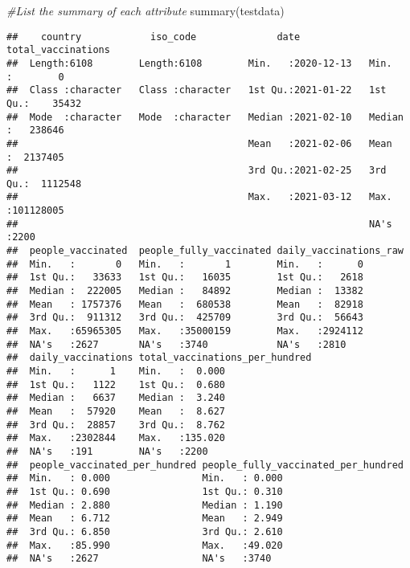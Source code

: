 \documentclass[
]{article}
\newenvironment{Shaded}{\begin{snugshade}}{\end{snugshade}}
\newcommand{\CommentTok}[1]{\textcolor[rgb]{0.56,0.35,0.01}{\textit{#1}}}
\newcommand{\FunctionTok}[1]{\textcolor[rgb]{0.00,0.00,0.00}{#1}}
\newcommand{\NormalTok}[1]{#1}
\begin{document}
\begin{Shaded}
\begin{Highlighting}[]
\CommentTok{\#List the summary of each attribute }
\FunctionTok{summary}\NormalTok{(testdata)}
\end{Highlighting}
\end{Shaded}

\begin{verbatim}
##    country            iso_code              date            total_vaccinations 
##  Length:6108        Length:6108        Min.   :2020-12-13   Min.   :        0  
##  Class :character   Class :character   1st Qu.:2021-01-22   1st Qu.:    35432  
##  Mode  :character   Mode  :character   Median :2021-02-10   Median :   238646  
##                                        Mean   :2021-02-06   Mean   :  2137405  
##                                        3rd Qu.:2021-02-25   3rd Qu.:  1112548  
##                                        Max.   :2021-03-12   Max.   :101128005  
##                                                             NA's   :2200       
##  people_vaccinated  people_fully_vaccinated daily_vaccinations_raw
##  Min.   :       0   Min.   :       1        Min.   :      0       
##  1st Qu.:   33633   1st Qu.:   16035        1st Qu.:   2618       
##  Median :  222005   Median :   84892        Median :  13382       
##  Mean   : 1757376   Mean   :  680538        Mean   :  82918       
##  3rd Qu.:  911312   3rd Qu.:  425709        3rd Qu.:  56643       
##  Max.   :65965305   Max.   :35000159        Max.   :2924112       
##  NA's   :2627       NA's   :3740            NA's   :2810          
##  daily_vaccinations total_vaccinations_per_hundred
##  Min.   :      1    Min.   :  0.000               
##  1st Qu.:   1122    1st Qu.:  0.680               
##  Median :   6637    Median :  3.240               
##  Mean   :  57920    Mean   :  8.627               
##  3rd Qu.:  28857    3rd Qu.:  8.762               
##  Max.   :2302844    Max.   :135.020               
##  NA's   :191        NA's   :2200                  
##  people_vaccinated_per_hundred people_fully_vaccinated_per_hundred
##  Min.   : 0.000                Min.   : 0.000                     
##  1st Qu.: 0.690                1st Qu.: 0.310                     
##  Median : 2.880                Median : 1.190                     
##  Mean   : 6.712                Mean   : 2.949                     
##  3rd Qu.: 6.850                3rd Qu.: 2.610                     
##  Max.   :85.990                Max.   :49.020                     
##  NA's   :2627                  NA's   :3740                       

\end{verbatim}
\end{document}
